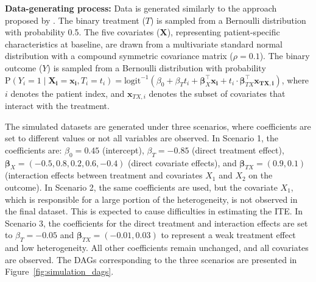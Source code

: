 \textbf{Data-generating process:} Data is generated similarly to the approach proposed by \citet{hoogland2021}. The binary treatment ($T$) is sampled from a Bernoulli distribution with probability 0.5. The five covariates ($\mathbf{X}$), representing patient-specific characteristics at baseline, are drawn from a multivariate standard normal distribution with a compound symmetric covariance matrix ($\rho=0.1$). The binary outcome ($Y$) is sampled from a Bernoulli distribution with probability $\text{P}(Y_i = 1 \mid  \mathbf{X_i} = \mathbf{x_i}, T_i = t_i) = \text{logit}^{-1} \left(\beta_0 + \beta_T t_i + \boldsymbol{\beta}_X^\top \mathbf{x_i} + t_i \cdot \boldsymbol{\beta}_{TX}^\top \mathbf{x_{TX,i}} \right)$, where $i$ denotes the patient index, and $\mathbf{x}_{TX,i}$ denotes the subset of covariates that interact with the treatment.

The simulated datasets are generated under three scenarios, where coefficients are set to different values or not all variables are observed. In Scenario 1, the coefficients are: $\beta_0 = 0.45$ (intercept), $\beta_T = -0.85$ (direct treatment effect), $\boldsymbol{\beta}_X = (-0.5, 0.8, 0.2, 0.6, -0.4)$ (direct covariate effects), and $\boldsymbol{\beta}_{TX} = (0.9, 0.1)$ (interaction effects between treatment and covariates $X_1$ and $X_2$ on the outcome). In Scenario 2, the same coefficients are used, but the covariate $X_1$, which is responsible for a large portion of the heterogeneity, is not observed in the final dataset. This is expected to cause difficulties in estimating the ITE. In Scenario 3, the coefficients for the direct treatment and interaction effects are set to $\beta_T = -0.05$ and $\boldsymbol{\beta}_{TX} = (-0.01, 0.03)$ to represent a weak treatment effect and low heterogeneity. All other coefficients remain unchanged, and all covariates are observed. The DAGs corresponding to the three scenarios are presented in Figure~\ref{fig:simulation_dags}.



